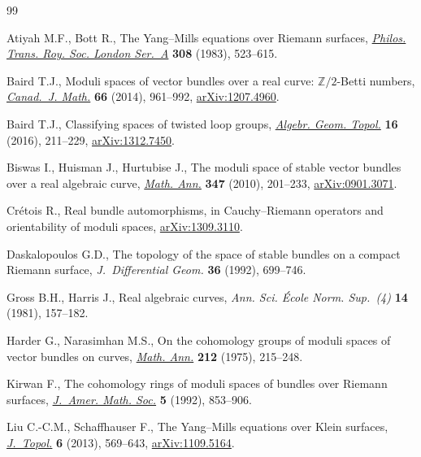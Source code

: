 \documentclass[10pt,a4paper]{amsart}
\numberwithin{equation}{section}
\begin{document}
\begin{thebibliography}{99}
\footnotesize\itemsep=0pt

Atiyah M.F., Bott R., The {Y}ang--{M}ills equations over {R}iemann surfaces,
 \href{http://dx.doi.org/10.1098/rsta.1983.0017}{\textit{Philos. Trans. Roy. Soc. London Ser.~A}} \textbf{308} (1983),
 523--615.

Baird T.J., Moduli spaces of vector bundles over a real curve:
 {$\mathbb{Z}/2$}-{B}etti numbers, \href{http://dx.doi.org/10.4153/CJM-2013-049-1}{\textit{Canad.~J. Math.}} \textbf{66}
 (2014), 961--992, \href{http://arxiv.org/abs/1207.4960}{arXiv:1207.4960}.

Baird T.J., Classifying spaces of twisted loop groups, \href{http://dx.doi.org/10.2140/agt.2016.16.211}{\textit{Algebr. Geom.
 Topol.}} \textbf{16} (2016), 211--229, \href{http://arxiv.org/abs/1312.7450}{arXiv:1312.7450}.

Biswas I., Huisman J., Hurtubise J., The moduli space of stable vector bundles
 over a real algebraic curve, \href{http://dx.doi.org/10.1007/s00208-009-0442-5}{\textit{Math. Ann.}} \textbf{347} (2010),
 201--233, \href{http://arxiv.org/abs/0901.3071}{arXiv:0901.3071}.

Cr{\'e}tois R., Real bundle automorphisms, in {C}auchy--{R}iemann operators and
 orientability of moduli spaces, \href{http://arxiv.org/abs/1309.3110}{arXiv:1309.3110}.

Daskalopoulos G.D., The topology of the space of stable bundles on a compact
 {R}iemann surface, \textit{J.~Diffe\-ren\-tial Geom.} \textbf{36} (1992),
 699--746.

Gross B.H., Harris J., Real algebraic curves, \textit{Ann. Sci. \'Ecole Norm.
 Sup.~(4)} \textbf{14} (1981), 157--182.

Harder G., Narasimhan M.S., On the cohomology groups of moduli spaces of vector
 bundles on curves, \href{http://dx.doi.org/10.1007/BF01357141}{\textit{Math. Ann.}} \textbf{212} (1975), 215--248.

Kirwan F., The cohomology rings of moduli spaces of bundles over {R}iemann
 surfaces, \href{http://dx.doi.org/10.2307/2152712}{\textit{J.~Amer. Math. Soc.}} \textbf{5} (1992), 853--906.

Liu C.-C.M., Schaf\/fhauser F., The {Y}ang--{M}ills equations over {K}lein
 surfaces, \href{http://dx.doi.org/10.1112/jtopol/jtt001}{\textit{J.~Topol.}} \textbf{6} (2013), 569--643, \href{http://arxiv.org/abs/1109.5164}{arXiv:1109.5164}.


\end{thebibliography}
\end{document}
